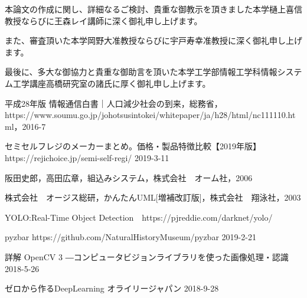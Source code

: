 本論文の作成に関し、詳細なるご検討、貴重な御教示を頂きました本学樋上喜信教授ならびに王森レイ講師に深く御礼申し上げます。

また、審査頂いた本学岡野大准教授ならびに宇戸寿幸准教授に深く御礼申し上げます。

最後に、多大な御協力と貴重な御助言を頂いた本学工学部情報工学科情報システム工学講座高橋研究室の諸氏に厚く御礼申し上げます。


\begin{thebibliography}{99}

平成28年版 情報通信白書｜人口減少社会の到来，総務省，https://www.soumu.go.jp/johotsusintokei/whitepaper/ja/h28/html/nc111110.html，2016-7


セミセルフレジのメーカーまとめ。価格・製品特徴比較【2019年版】 https://rejichoice.jp/semi-self-regi/
2019-3-11

阪田史郎，高田広章，組込みシステム，株式会社　オーム社，2006

株式会社　オージス総研，かんたんUML[増補改訂版]，株式会社　翔泳社，2003

YOLO:Real-Time Object Detection　https://pjreddie.com/darknet/yolo/

pyzbar https://github.com/NaturalHistoryMuseum/pyzbar 2019-2-21

詳解 OpenCV 3 ―コンピュータビジョンライブラリを使った画像処理・認識 2018-5-26

ゼロから作るDeepLearning オライリージャパン  2018-9-28


\end{thebibliography}

